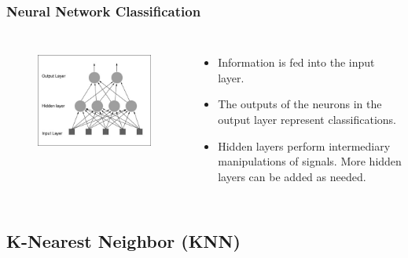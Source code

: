 \documentclass[mathserif]{beamer}
\begin{document}
	\begin{frame}
		\frametitle{Neural Network Classification}
		\begin{columns}[t]
			\begin{figure}
				\centering
				\includegraphics[keepaspectratio,scale=0.4]{NN_2.jpg} \\ \vspace{5px}
			\end{figure}
			
			\begin{itemize}
				\item Information is fed into the input layer.
				\item The outputs of the neurons in the output layer represent classifications.
				\item Hidden layers perform intermediary manipulations of signals. More hidden layers can be added as needed.
			\end{itemize}
		\end{columns}
	\end{frame}
	
	\subsection{K-Nearest Neighbor (KNN)}
\end{document}
